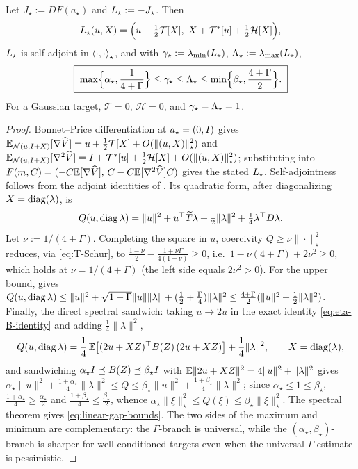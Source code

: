 \begin{proposition}
\label{prop:linearized}
Let $J_\star:=DF(a_\star)$ and $L_\star:=-J_\star$. Then
\[
    L_\star(u,X)=\Bigl(u+\tfrac12\mathcal T[X],\;X+\mathcal T^*[u]+\tfrac12\mathcal H[X]\Bigr),
\]
$L_\star$ is self-adjoint in $\left\langle \cdot,\cdot\right\rangle_\star$, and with
$\gamma_\star:=\lambda_{\min}(L_\star)$, $\Lambda_\star:=\lambda_{\max}(L_\star)$,
\begin{equation}
\label{eq:linear-gap-bounds}
    \boxed{\;\max\Bigl\{\alpha_\star,\frac1{4+\Gamma}\Bigr\}\leq\gamma_\star\leq\Lambda_\star\leq\min\Bigl\{\beta_\star,\frac{4+\Gamma}2\Bigr\} .\;}
\end{equation}
For a Gaussian target, $\mathcal T=0$, $\mathcal H=0$, and $\gamma_\star=\Lambda_\star=1$.
\end{proposition}

\begin{proof}
Bonnet--Price differentiation at $a_\star=(0,I)$ gives
$\mathbb{E}_{\mathcal{N}(u,I+X)}[\nabla\widehat V]=u+\tfrac12\mathcal T[X]+O(\|(u,X)\|_\star^2)$ and
$\mathbb{E}_{\mathcal{N}(u,I+X)}[\nabla^2\widehat V]=I+\mathcal T^*[u]+\tfrac12\mathcal H[X]+O(\|(u,X)\|_\star^2)$;
substituting into $F(m,C)=(-C\mathbb{E}[\nabla\widehat V],\,C-C\mathbb{E}[\nabla^2\widehat V]C)$ gives the stated
$L_\star$. Self-adjointness follows from the adjoint identities of . Its
quadratic form, after diagonalizing $X=\operatorname{diag}(\lambda)$, is
\[
    Q(u,\operatorname{diag}\lambda)=\|u\|^2+u^\top\widetilde T\lambda+\tfrac12\|\lambda\|^2+\tfrac14\lambda^\top D\lambda.
\]
Let $\nu:=1/(4+\Gamma)$. Completing the square in $u$, coercivity $Q\geq\nu\|\cdot\|_\star^2$ reduces,
via \eqref{eq:T-Schur}, to $\tfrac{1-\nu}2-\tfrac{1+\nu\Gamma}{4(1-\nu)}\geq0$, i.e.\
$1-\nu(4+\Gamma)+2\nu^2\geq0$, which holds at $\nu=1/(4+\Gamma)$ (the left side equals $2\nu^2>0$).
For the upper bound, \Cref{lem:linear-diagonal-bounds} gives
$Q(u,\operatorname{diag}\lambda)\leq\|u\|^2+\sqrt{1+\Gamma}\|u\|\|\lambda\|+(\tfrac12+\tfrac\Gamma4)\|\lambda\|^2\leq\tfrac{4+\Gamma}2(\|u\|^2+\tfrac12\|\lambda\|^2)$.
Finally, the direct spectral sandwich: taking $u\to2u$ in the exact identity
\eqref{eq:eta-B-identity} and adding $\tfrac14\|\lambda\|^2$,
\[
    Q(u,\operatorname{diag}\lambda)
    =\frac14\,\mathbb{E}\bigl[(2u+XZ)^\top B(Z)\,(2u+XZ)\bigr]+\frac14\|\lambda\|^2,
    \qquad X=\operatorname{diag}(\lambda),
\]
and sandwiching $\alpha_\star I\preceq B(Z)\preceq\beta_\star I$ with
$\mathbb{E}\|2u+XZ\|^2=4\|u\|^2+\|\lambda\|^2$ gives
$\alpha_\star\|u\|^2+\tfrac{1+\alpha_\star}4\|\lambda\|^2\leq Q\leq\beta_\star\|u\|^2+\tfrac{1+\beta_\star}4\|\lambda\|^2$;
since $\alpha_\star\leq1\leq\beta_\star$, $\tfrac{1+\alpha_\star}4\geq\tfrac{\alpha_\star}2$ and
$\tfrac{1+\beta_\star}4\leq\tfrac{\beta_\star}2$, whence
$\alpha_\star\|\xi\|_\star^2\leq Q(\xi)\leq\beta_\star\|\xi\|_\star^2$. The spectral theorem gives
\eqref{eq:linear-gap-bounds}. The two sides of the maximum and minimum are complementary: the
$\Gamma$-branch is universal, while the $(\alpha_\star,\beta_\star)$-branch is sharper for
well-conditioned targets even when the universal $\Gamma$ estimate is pessimistic.
\end{proof}

